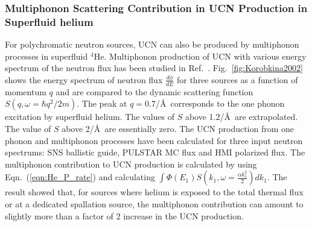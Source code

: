 


\subsubsection{Multiphonon Scattering Contribution in UCN Production in Superfluid helium~\cite{Korobkina2002,Schmidt2009}}
For polychromatic neutron sources, UCN can also be produced by
multiphonon processes in superfluid $^4$He. Multiphonon production of
UCN with various energy spectrum of the neutron flux has been studied
in Ref.~\cite{Korobkina2002}.  Fig.~\ref{fig:Korobkina2002} shows
the energy spectrum of neutron flux $\frac{d\phi}{dE}$ for three
sources as a function of momentum $q$ and are compared to the dynamic
scattering function $S(q,\omega=\hbar q^2/2m)$. The peak at
$q=0.7$/\AA~corresponds to the one phonon excitation by superfluid
helium. The values of $S$ above 1.2/\AA~are extrapolated. The value of
$S$ above 2/\AA~are essentially zero.  The UCN production from one
phonon and multiphonon processes have been calculated for three input
neutron spectrums: SNS ballistic guide, PULSTAR MC flux and HMI
polarized flux.  The multiphonon contribution to UCN production is
calculated by using Eqn.~(\ref{eqn:He_P_rate}) and calculating $\int
\Phi(E_1)S(k_1,\omega=\frac{\alpha k_1^2}{2}) dk_1$.  The result
showed that, for sources where helium is exposed to the total thermal
flux or at a dedicated spallation source, the multiphonon contribution
can amount to slightly more than a factor of 2 increase in the UCN
production.





